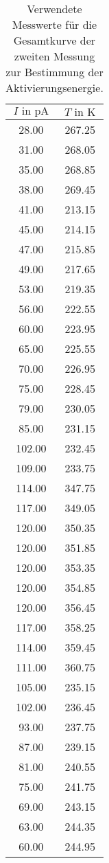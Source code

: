 \begin{table}
  \centering
  \caption{Verwendete Messwerte für die Gesamtkurve der zweiten Messung zur Bestimmung der Aktivierungsenergie.}
  \label{tab:lnlinfit2}
  \begin{tabular}{c c}
    \toprule
    $I \text{ in } \si{\pico\ampere}$ & $ T \text{ in } \si{\kelvin} $ \\
    \midrule
     28.00 & 267.25\\
     31.00 & 268.05\\
     35.00 & 268.85\\
     38.00 & 269.45\\
     41.00 & 213.15\\
     45.00 & 214.15\\
     47.00 & 215.85\\
     49.00 & 217.65\\
     53.00 & 219.35\\
     56.00 & 222.55\\
     60.00 & 223.95\\
     65.00 & 225.55\\
     70.00 & 226.95\\
     75.00 & 228.45\\
     79.00 & 230.05\\
     85.00 & 231.15\\
    102.00 & 232.45\\
    109.00 & 233.75\\
    114.00 & 347.75\\
    117.00 & 349.05\\
    120.00 & 350.35\\
    120.00 & 351.85\\
    120.00 & 353.35\\
    120.00 & 354.85\\
    120.00 & 356.45\\
    117.00 & 358.25\\
    114.00 & 359.45\\
    111.00 & 360.75\\
    105.00 & 235.15\\
    102.00 & 236.45\\
     93.00 & 237.75\\
     87.00 & 239.15\\
     81.00 & 240.55\\
     75.00 & 241.75\\
     69.00 & 243.15\\
     63.00 & 244.35\\
     60.00 & 244.95\\
    \bottomrule
  \end{tabular}
\end{table}
\FloatBarrier

